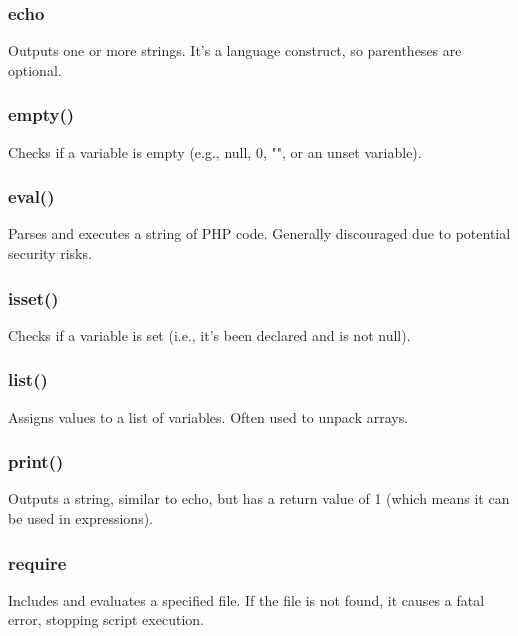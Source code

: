 \documentclass{report}
\begin{document}
    \bigbreak \noindent 
    \subsubsection{echo}
    \bigbreak \noindent 
    Outputs one or more strings. It’s a language construct, so parentheses are optional.

    \bigbreak \noindent 
    \subsubsection{empty()}
    \bigbreak \noindent 
    Checks if a variable is empty (e.g., null, 0, "", or an unset variable).

    \bigbreak \noindent 
    \subsubsection{eval()}
    \bigbreak \noindent 
    Parses and executes a string of PHP code. Generally discouraged due to potential security risks.

    \bigbreak \noindent 
    \subsubsection{isset()}
    \bigbreak \noindent 
    Checks if a variable is set (i.e., it’s been declared and is not null).

    \bigbreak \noindent 
    \subsubsection{list()}
    \bigbreak \noindent 
    Assigns values to a list of variables. Often used to unpack arrays.

    \bigbreak \noindent 
    \subsubsection{print()}
    \bigbreak \noindent 
    Outputs a string, similar to echo, but has a return value of 1 (which means it can be used in expressions).

    \bigbreak \noindent 
    \subsubsection{require}
    \bigbreak \noindent 
    Includes and evaluates a specified file. If the file is not found, it causes a fatal error, stopping script execution.

    \bigbreak \noindent 
\end{document}

